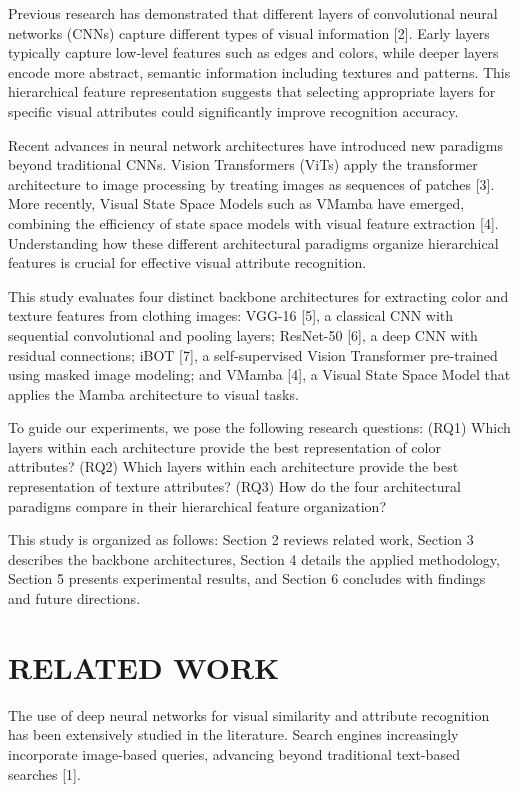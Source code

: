 \documentclass[conference]{IEEEtran}
\begin{document}
Previous research has demonstrated that different layers of convolutional neural networks (CNNs) capture different types of visual information [2]. Early layers typically capture low-level features such as edges and colors, while deeper layers encode more abstract, semantic information including textures and patterns. This hierarchical feature representation suggests that selecting appropriate layers for specific visual attributes could significantly improve recognition accuracy.

Recent advances in neural network architectures have introduced new paradigms beyond traditional CNNs. Vision Transformers (ViTs) apply the transformer architecture to image processing by treating images as sequences of patches [3]. More recently, Visual State Space Models such as VMamba have emerged, combining the efficiency of state space models with visual feature extraction [4]. Understanding how these different architectural paradigms organize hierarchical features is crucial for effective visual attribute recognition.

This study evaluates four distinct backbone architectures for extracting color and texture features from clothing images: VGG-16 [5], a classical CNN with sequential convolutional and pooling layers; ResNet-50 [6], a deep CNN with residual connections; iBOT [7], a self-supervised Vision Transformer pre-trained using masked image modeling; and VMamba [4], a Visual State Space Model that applies the Mamba architecture to visual tasks.

To guide our experiments, we pose the following research questions:
(RQ1) Which layers within each architecture provide the best representation of color attributes?
(RQ2) Which layers within each architecture provide the best representation of texture attributes?
(RQ3) How do the four architectural paradigms compare in their hierarchical feature organization?

This study is organized as follows: Section 2 reviews related work, Section 3 describes the backbone architectures, Section 4 details the applied methodology, Section 5 presents experimental results, and Section 6 concludes with findings and future directions.


\section{RELATED WORK}

The use of deep neural networks for visual similarity and attribute recognition has been extensively studied in the literature. Search engines increasingly incorporate image-based queries, advancing beyond traditional text-based searches [1].
\end{document}
